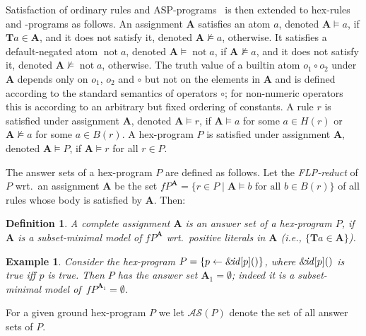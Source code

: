 \documentclass[11pt,fleqn,twoside]{article}
\def\naf{\ensuremath{\mathop{not}}}
\newcommand\hex{{\sc hex}\xspace}
\newcommand{\amp}[1]{\ensuremath{\text{\textsl{{\&}}}\!\mathit{#1}}}
\newcommand{\ext}[3]{\ensuremath{\amp{#1}[#2](#3)}}
\newcommand{\T}{\mathbf{T}}
\newcommand{\Assignment}{\ensuremath{\mathbf{A}}}
\newcommand{\Program}{\ensuremath{P}}
\newtheorem{definition}{Definition}
\newtheorem{example}{Example}
\begin{document}
		Satisfaction of ordinary rules and ASP-programs~\cite{gelf-lifs-91}
		is then extended to 
		\hex-rules and -programs as follows.
		An assignment $\Assignment$ satisfies an atom $a$, denoted $\Assignment \models a$, if $\T a \in \Assignment$, and it does not satisfy it, denoted $\Assignment \not\models a$, otherwise.
		It satisfies a default-negated atom $\naf a$, denoted $\Assignment \models \naf a$, if $\Assignment \not\models a$, and it does not satisfy it, denoted $\Assignment \not\models \naf a$, otherwise.
		The truth value of a builtin atom $o_1 \circ o_2$ under $\Assignment$ depends only on $o_1$, $o_2$ and $\circ$ but not on the elements in $\Assignment$
		and is defined according to the standard semantics of operators $\circ$; for non-numeric operators this is according to an arbitrary but fixed ordering of constants.
		A rule $r$ is satisfied under assignment $\Assignment$, denoted $\Assignment \models r$, if $\Assignment \models a$ for some $a \in H(r)$ or $\Assignment \not\models a$ for some $a \in B(r)$.
		A \hex-program $\Program$ is satisfied under assignment $\Assignment$, denoted $\Assignment \models P$, if $\Assignment \models r$ for all $r \in P$.

		The answer sets of a \hex-program $\Program$ are defined as follows.
		Let the \emph{FLP-reduct} of $\Program$ wrt.~an assignment $\Assignment$
		be the set $f P^{\Assignment} = \{ r \in P \mid \Assignment \models b \text{ for all } b \in B(r) \}$
		of all rules whose body is satisfied by $\Assignment$.
		Then:
		\begin{definition}
			\label{def:answerset}
			A complete assignment $\Assignment$ is an answer set of a \hex-program $\Program$,
			if $\Assignment$ is a subset-minimal model of  
			$f P^{\Assignment}$ wrt.~positive literals in $\Assignment$ (i.e., $\{ \T a \in \Assignment \}$).
		\end{definition}

		\begin{example}
			\label{ex:id}
			Consider the \hex-program %
			$\Program = \{ p \leftarrow \ext{\mathit{id}}{p}{} \}$,
			where $\ext{\mathit{id}}{p}{}$ is true iff $p$ is true. Then 
			$\Program$ has the answer set $\Assignment_1 = \emptyset$; indeed it is
			a subset-minimal model of~$f P^{\Assignment_1} = \emptyset$.
		\end{example}
		
		For a given ground \hex-program $\Program$ we let $\mathcal{AS}(P)$ denote the set of all answer sets of $\Program$.
\end{document}
